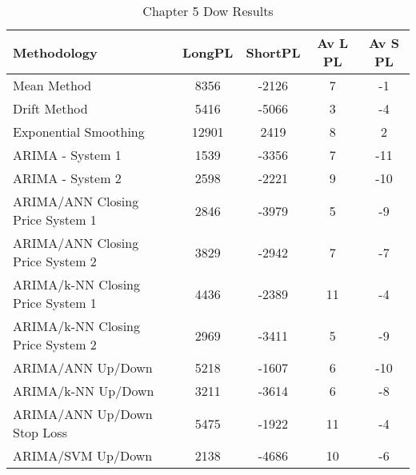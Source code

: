 \begin{table}[ht]
\centering
\caption[Chapter 5 Dow Results]{Chapter 5 Dow Results} 
\label{tab:chp6:dow2_summary}
\begin{tabular}{lcccc}
  \toprule Methodology & LongPL & ShortPL & Av L PL & Av S PL \\ 
  \midrule Mean Method & 8356 & -2126 & 7 & -1 \\ 
  Drift Method & 5416 & -5066 & 3 & -4 \\ 
  Exponential Smoothing & 12901 & 2419 & 8 & 2 \\ 
  ARIMA - System 1 & 1539 & -3356 & 7 & -11 \\ 
  ARIMA - System 2 & 2598 & -2221 & 9 & -10 \\ 
  ARIMA/ANN Closing Price System 1 & 2846 & -3979 & 5 & -9 \\ 
  ARIMA/ANN Closing Price System 2 & 3829 & -2942 & 7 & -7 \\ 
  ARIMA/k-NN Closing Price System 1 & 4436 & -2389 & 11 & -4 \\ 
  ARIMA/k-NN Closing Price System 2 & 2969 & -3411 & 5 & -9 \\ 
  ARIMA/ANN Up/Down & 5218 & -1607 & 6 & -10 \\ 
  ARIMA/k-NN Up/Down & 3211 & -3614 & 6 & -8 \\ 
  ARIMA/ANN Up/Down Stop Loss & 5475 & -1922 & 11 & -4 \\ 
  ARIMA/SVM Up/Down & 2138 & -4686 & 10 & -6 \\ 
   \bottomrule \end{tabular}
\end{table}
